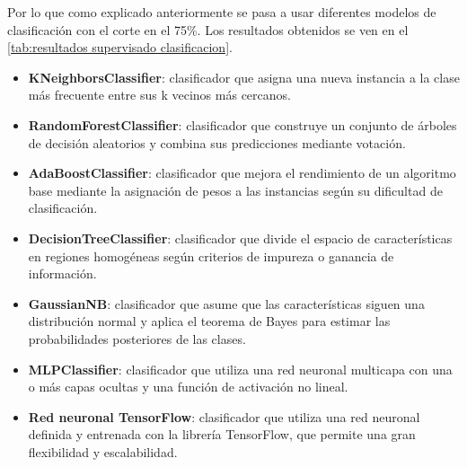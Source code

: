 \documentclass{wsdcr}
\begin{document}
Por lo que como explicado anteriormente se pasa a usar diferentes modelos de clasificación con el corte en el 75\%. Los resultados obtenidos se ven en el \tablename{\ref{tab:resultados supervisado clasificacion}}.


\begin{itemize}
    \setlength\itemsep{0em}
    \item \textbf{KNeighborsClassifier}: clasificador que asigna una nueva instancia a la clase más frecuente entre sus k vecinos más cercanos.
    \item \textbf{RandomForestClassifier}: clasificador que construye un conjunto de árboles de decisión aleatorios y combina sus predicciones mediante votación.
    \item \textbf{AdaBoostClassifier}: clasificador que mejora el rendimiento de un algoritmo base mediante la asignación de pesos a las instancias según su dificultad de clasificación.
    \item \textbf{DecisionTreeClassifier}: clasificador que divide el espacio de características en regiones homogéneas según criterios de impureza o ganancia de información.
    \item \textbf{GaussianNB}: clasificador que asume que las características siguen una distribución normal y aplica el teorema de Bayes para estimar las probabilidades posteriores de las clases.
    \item \textbf{MLPClassifier}: clasificador que utiliza una red neuronal multicapa con una o más capas ocultas y una función de activación no lineal.
    \item \textbf{Red neuronal TensorFlow}: clasificador que utiliza una red neuronal definida y entrenada con la librería TensorFlow, que permite una gran flexibilidad y escalabilidad.
\end{itemize}
\end{document}
